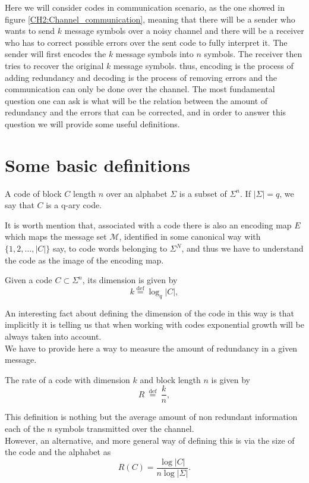\indent Here we will consider codes in communication scenario, as the one showed in figure \ref{CH2:Channel_communication}, meaning that there will be a sender who wants to send $k$ message symbols over a noisy channel and there will be a receiver who has to correct possible errors over the sent code to fully interpret it. The sender will first encodes the $k$ message symbols into $n$ symbols. The receiver then tries to recover the original $k$ message symbols. thus, encoding is the process of adding redundancy and decoding is the process of removing errors and the communication can only be done over the channel\cite{mackay_information_2003}. The most fundamental question one can ask is what will be the relation between the amount of redundancy and the errors that can be corrected, and in order to answer this question we will provide some useful definitions.
\section{Some basic definitions}
\begin{definition}[Code]
A code of block $C$ length $n$ over an alphabet $\Sigma$ is a subset of $\Sigma^n$.  If $|\Sigma|=q$, we say that $C$ is a q-ary code.
\end{definition}
\indent It is worth mention that, associated with a code there is also an encoding map $E$ which maps the message set $\mathcal{M}$, identified in some canonical way with $\{1,2,\ldots,|C|\}$ say, to code words belonging to $\Sigma^N$, and thus we have to understand the code as the image of the encoding map\cite{jaynes_probability_2003}.
\begin{definition}
Given a code $C\subset\Sigma^n$, its dimension is given by
  \begin{equation}
  k \stackrel{\mathrm{def}}{=} \log _{q}|C|,
  \label{CH2:diemnsion_of_code}
  \end{equation}
 \end{definition}
\indent An interesting fact about defining  the dimension of the code in this way is that implicitly it is telling us that when working with codes exponential growth will be always taken into account.\\

\indent We have to provide here a way to measure the amount of redundancy in a given message.
	\begin{definition}
	The rate of a code with dimension $k$ and block length $n$ is given by 
	\begin{equation}
		R \stackrel{\text { def }}{=} \frac{k}{n},
		\label{CH2:Rate_of_code}
	\end{equation}
	\end{definition}
\indent This definition is nothing but the average amount of non redundant information each of the $n$ symbols transmitted over the channel.\\ However, an alternative, and more general way of defining this is via the size of the code and the alphabet as
\begin{equation}
R(C)=\frac{\log |C|}{n \log |\Sigma|}.
\end{equation}

